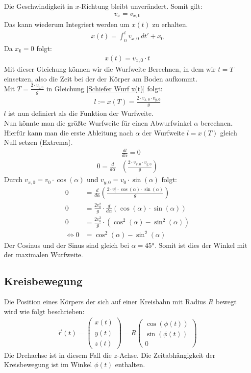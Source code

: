 \documentclass{article}
\begin{document}
Die Geschwindigkeit in $x$-Richtung bleibt unverändert. Somit gilt:
\begin{align}
    v_x=v_{x,0}
\end{align}
Das kann wiederum Integriert werden um $x(t)$ zu erhalten.
\begin{align}
    x(t)=\int_{0}^{t}v_{x,0}\ dt' + x_0
\end{align}
Da $x_0=0$ folgt:
\begin{align}
    x(t)=v_{x,0}\cdot t \label{Schiefer Wurf x(t)}
\end{align}
Mit dieser Gleichung können wir die Wurfweite Berechnen, in dem wir $t=T$ einsetzen, also die Zeit bei der der Körper am Boden
aufkommt. \\
Mit $T=\frac{2\cdot v_{y,0}}{g}$ in Gleichung \ref{Schiefer Wurf x(t)} folgt:
\begin{align}
    l:=x(T)=\frac{2\cdot v_{x,0}\cdot v_{y,0}}{g}
\end{align}
$l$ ist nun definiert als die Funktion der Wurfweite.\\
Nun könnte man die größte Wurfweite für einen Abwurfwinkel $\alpha$ berechnen. Hierfür kann man die erste Ableitung nach $\alpha$ der Wurfweite $l=x(T)$ gleich Null setzen (Extrema).
\begin{align}
    &\frac{dl}{d\alpha}=0\\
    0=\frac{d}{d\alpha}&\left(\frac{2\cdot v_{x,0}\cdot v_{y,0}}{g}\right)
\end{align}
Durch $v_{x,0}=v_0\cdot \cos(\alpha)$ und $v_{y,0}=v_0\cdot \sin(\alpha)$ folgt:
\begin{align}
    0&=\frac{d}{d\alpha}\left(\frac{2\cdot v^2_0\cdot \cos(\alpha)\cdot \sin(\alpha)}{g}\right)\\
    0&=\frac{2v_0^2}{g}\cdot \frac{d}{d\alpha}\left(\cos(\alpha)\cdot \sin(\alpha)\right)\\
    0&=\frac{2v_0^2}{g}\cdot (\cos^2(\alpha)-\sin^2(\alpha))\\
    \Longleftrightarrow 0&=\cos^2(\alpha)-\sin^2(\alpha)
\end{align}
Der Cosinus und der Sinus sind gleich bei $\alpha=45$°. Somit ist dies der Winkel mit der maximalen Wurfweite.


\subsection{Kreisbewegung}
Die Position eines Körpers der sich auf einer Kreisbahn mit Radius $R$ bewegt wird wie folgt beschrieben:
\begin{align}
    \vec{r}(t)=\left(\begin{matrix}
        x(t)\\y(t)\\z(t)
    \end{matrix}\right)=R\left(\begin{matrix}
        \cos(\phi(t))\\ \sin(\phi(t))\\0
    \end{matrix}\right)
\end{align} 
Die Drehachse ist in diesem Fall die $z$-Achse. Die Zeitabhängigkeit der Kreisbewegung ist im Winkel $\phi(t)$ enthalten.
\end{document}
